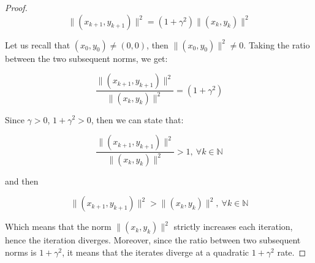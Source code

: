 \documentclass[12pt]{article}
\begin{document}
\begin{proof}
\begin{equation*}
    \lVert (x_{k+1}, y_{k+1}) \rVert ^ 2 = (1 + \gamma^{2}) \lVert (x_{k}, y_{k}) \rVert ^{2}
\end{equation*}

Let us recall that $(x_{0}, y_{0}) \neq (0, 0)$, then $\lVert (x_{0}, y_{0}) \rVert ^ 2 \neq 0$. Taking the ratio between the two subsequent norms, we get:

\begin{equation*}
    \frac{\lVert (x_{k+1}, y_{k+1}) \rVert ^ 2}{\lVert (x_{k}, y_{k}) \rVert ^{2}} = (1 + \gamma^{2})
\end{equation*}

Since $\gamma > 0$, $1 + \gamma^{2} > 0$, then we can state that:

\begin{equation*}
    \frac{\lVert (x_{k+1}, y_{k+1}) \rVert ^ 2}{\lVert (x_{k}, y_{k}) \rVert ^{2}} > 1, \ \forall k \in \mathbb{N}
\end{equation*}

and then

\begin{equation}
    \lVert (x_{k+1}, y_{k+1}) \rVert ^ 2 > \lVert (x_{k}, y_{k}) \rVert ^{2}, \ \forall k \in \mathbb{N}
\end{equation}

Which means that the norm $\lVert (x_{k}, y_{k}) \rVert ^{2}$ strictly increases each iteration, hence the iteration diverges. Moreover, since the ratio between two subsequent norms is $1 + \gamma^{2}$, it means that the iterates diverge at a quadratic $1 + \gamma^{2}$ rate.

\end{proof}
\end{document}
